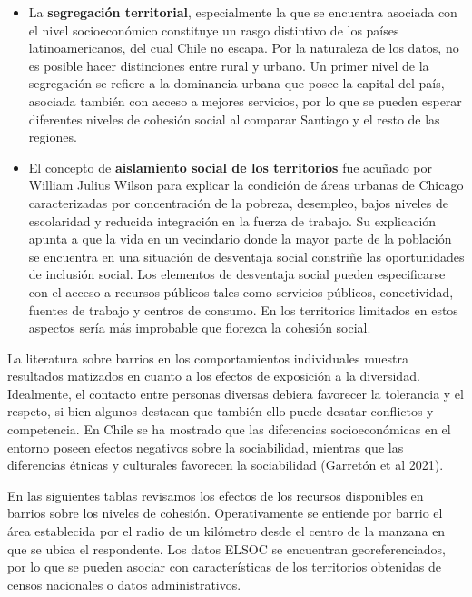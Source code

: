 \documentclass[
  12pt,
]{book}
\begin{document}
\begin{itemize}
\item
  La \textbf{segregación territorial}, especialmente la que se encuentra asociada con el nivel socioeconómico constituye un rasgo distintivo de los países latinoamericanos, del cual Chile no escapa. Por la naturaleza de los datos, no es posible hacer distinciones entre rural y urbano. Un primer nivel de la segregación se refiere a la dominancia urbana que posee la capital del país, asociada también con acceso a mejores servicios, por lo que se pueden esperar diferentes niveles de cohesión social al comparar Santiago y el resto de las regiones.
\item
  El concepto de \textbf{aislamiento social de los territorios} fue acuñado por William Julius Wilson para explicar la condición de áreas urbanas de Chicago caracterizadas por concentración de la pobreza, desempleo, bajos niveles de escolaridad y reducida integración en la fuerza de trabajo. Su explicación apunta a que la vida en un vecindario donde la mayor parte de la población se encuentra en una situación de desventaja social constriñe las oportunidades de inclusión social. Los elementos de desventaja social pueden especificarse con el acceso a recursos públicos tales como servicios públicos, conectividad, fuentes de trabajo y centros de consumo. En los territorios limitados en estos aspectos sería más improbable que florezca la cohesión social.
\end{itemize}

La literatura sobre barrios en los comportamientos individuales muestra resultados matizados en cuanto a los efectos de exposición a la diversidad. Idealmente, el contacto entre personas diversas debiera favorecer la tolerancia y el respeto, si bien algunos destacan que también ello puede desatar conflictos y competencia. En Chile se ha mostrado que las diferencias socioeconómicas en el entorno poseen efectos negativos sobre la sociabilidad, mientras que las diferencias étnicas y culturales favorecen la sociabilidad (Garretón et al 2021).

En las siguientes tablas revisamos los efectos de los recursos disponibles en barrios sobre los niveles de cohesión. Operativamente se entiende por barrio el área establecida por el radio de un kilómetro desde el centro de la manzana en que se ubica el respondente. Los datos ELSOC se encuentran georeferenciados, por lo que se pueden asociar con características de los territorios obtenidas de censos nacionales o datos administrativos.
\end{document}
